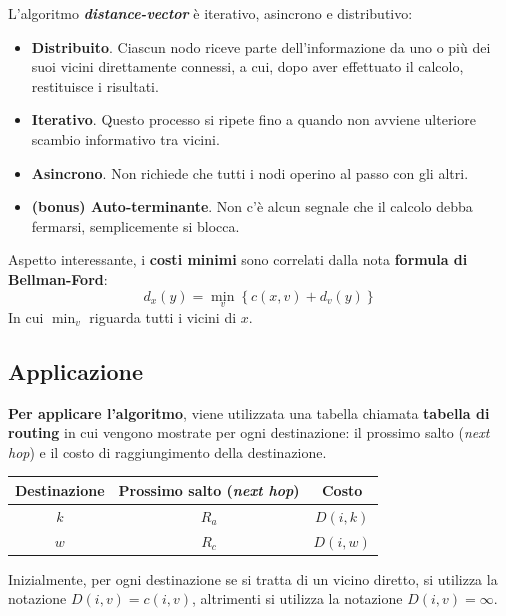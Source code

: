 \documentclass[a4paper]{article}
\begin{document}
	L'algoritmo \textcolor{Red3}{\textbf{\emph{distance-vector}}} è iterativo, asincrono e distributivo:
	\begin{itemize}
		\item \textbf{Distribuito}. Ciascun nodo riceve parte dell’informazione da uno o più dei suoi vicini direttamente connessi, a cui, dopo aver effettuato il calcolo, restituisce i risultati.
		\item \textbf{Iterativo}. Questo processo si ripete fino a quando non avviene ulteriore scambio informativo tra vicini.
		\item \textbf{Asincrono}. Non richiede che tutti i nodi operino al passo con gli altri.
		\item \textbf{(bonus) Auto-terminante}. Non c’è alcun segnale che il calcolo debba fermarsi, semplicemente si blocca.
	\end{itemize}
	Aspetto interessante, i \textbf{costi minimi} sono correlati dalla nota \textbf{formula di Bellman-Ford}:
	\begin{equation*}
		d_{x}\left(y\right) = \min_{v}\left\{c\left(x,v\right) + d_{v}\left(y\right)\right\}
	\end{equation*}
	In cui $\min_{v}$ riguarda tutti i vicini di $x$.
	
	\subsection{Applicazione}
	
	\textbf{Per applicare l’algoritmo}, viene utilizzata una tabella chiamata \textbf{tabella di routing} in cui vengono mostrate per ogni destinazione: il prossimo salto (\emph{next hop}) e il costo di raggiungimento della destinazione.
	\begin{table}[!htbp]
		\centering
		\begin{tabular}{@{} c c c @{}}
			\toprule
			Destinazione	& Prossimo salto (\emph{next hop})	& Costo \\
			\midrule
			$k$				& $R_{a}$							& $D\left(i,k\right)$ \\
			$w$				& $R_{c}$							& $D\left(i,w\right)$ \\
			\bottomrule
		\end{tabular}
	\end{table}
	Inizialmente, per ogni destinazione se si tratta di un vicino diretto, si utilizza la notazione $D\left(i,v\right) = c\left(i,v\right)$, altrimenti si utilizza la notazione $D\left(i,v\right) = \infty$.\newline
	
\end{document}
